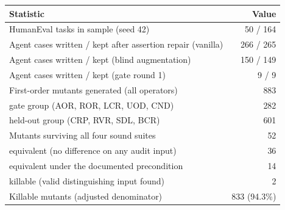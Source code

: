 \begin{tabular}{@{}lr@{}}
\toprule
Statistic & Value\\
\midrule
HumanEval tasks in sample (seed 42) & 50 / 164\\
Agent cases written / kept after assertion repair (vanilla) & 266 / 265\\
Agent cases written / kept (blind augmentation) & 150 / 149\\
Agent cases written / kept (gate round 1) & 9 / 9\\
First-order mutants generated (all operators) & 883\\
\quad gate group (AOR, ROR, LCR, UOD, CND) & 282\\
\quad held-out group (CRP, RVR, SDL, BCR) & 601\\
Mutants surviving all four sound suites & 52\\
\quad equivalent (no difference on any audit input) & 36\\
\quad equivalent under the documented precondition & 14\\
\quad killable (valid distinguishing input found) & 2\\
Killable mutants (adjusted denominator) & 833 (94.3\%)\\
\bottomrule
\end{tabular}
